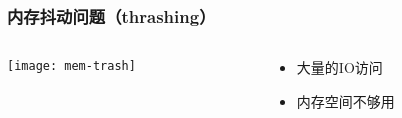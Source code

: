 %
\begin{frame}[plain]
    \frametitle{内存抖动问题（thrashing）}
	\begin{columns}
		\begin{column}{.5\textwidth}
	
	\texttt{[image: mem-trash]}
	
\end{column}

		\begin{column}{.5\textwidth}
			
				\begin{itemize}\large
					\item 大量的IO访问
					\item 内存空间不够用
				\end{itemize}
			
		\end{column}
		

	\end{columns}
\end{frame}



